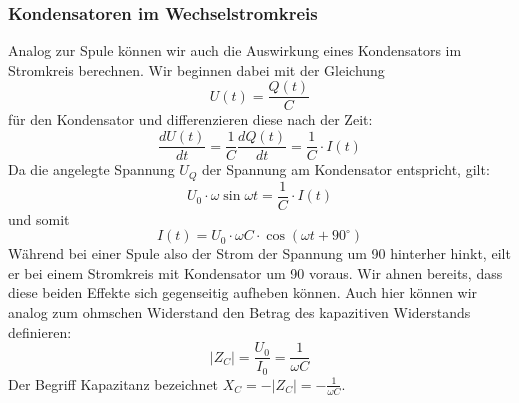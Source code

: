 \subsubsection{Kondensatoren im Wechselstromkreis}
Analog zur Spule können wir auch die Auswirkung eines Kondensators im Stromkreis berechnen.
Wir beginnen dabei mit der Gleichung
\begin{equation}
U(t) = \frac{Q(t)}{C}
\end{equation}
für den Kondensator und differenzieren diese nach der Zeit:
\begin{equation}
\frac{dU(t)}{dt} = \frac{1}{C}\frac{dQ(t)}{dt} = \frac{1}{C} \cdot I(t)
\end{equation}
Da die angelegte Spannung $U_Q$ der Spannung am Kondensator entspricht, gilt:
\begin{equation}
U_0\cdot \omega \sin \omega t = \frac{1}{C} \cdot I(t)
\end{equation}
und somit
\begin{equation}
I(t) = U_0\cdot \omega C \cdot\cos\left( \omega t + 90^\circ\right)
\end{equation}
Während bei einer Spule also der Strom der Spannung um \unit{90}{\degree} hinterher hinkt, eilt er bei einem Stromkreis mit Kondensator um \unit{90}{\degree} voraus. Wir ahnen bereits, dass diese beiden Effekte sich gegenseitig aufheben können.
Auch hier können wir analog zum ohmschen Widerstand den Betrag des kapazitiven Widerstands definieren:
\begin{equation}
\left|Z_C\right| = \frac{U_0}{I_0} = \frac{1}{\omega C}
\end{equation}
Der Begriff Kapazitanz bezeichnet $X_C = -\left|Z_C\right| = -\frac{1}{\omega C}$.

